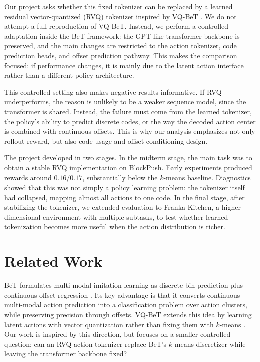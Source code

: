 \documentclass[conference]{IEEEtran}
\begin{document}
Our project asks whether this fixed tokenizer can be replaced by a learned residual vector-quantized (RVQ) tokenizer inspired by VQ-BeT \cite{lee2024vqbet}. We do not attempt a full reproduction of VQ-BeT. Instead, we perform a controlled adaptation inside the BeT framework: the GPT-like transformer backbone is preserved, and the main changes are restricted to the action tokenizer, code prediction heads, and offset prediction pathway. This makes the comparison focused: if performance changes, it is mainly due to the latent action interface rather than a different policy architecture.

This controlled setting also makes negative results informative. If RVQ underperforms, the reason is unlikely to be a weaker sequence model, since the transformer is shared. Instead, the failure must come from the learned tokenizer, the policy's ability to predict discrete codes, or the way the decoded action center is combined with continuous offsets. This is why our analysis emphasizes not only rollout reward, but also code usage and offset-conditioning design.

The project developed in two stages. In the midterm stage, the main task was to obtain a stable RVQ implementation on BlockPush. Early experiments produced rewards around $0.16/0.17$, substantially below the $k$-means baseline. Diagnostics showed that this was not simply a policy learning problem: the tokenizer itself had collapsed, mapping almost all actions to one code. In the final stage, after stabilizing the tokenizer, we extended evaluation to Franka Kitchen, a higher-dimensional environment with multiple subtasks, to test whether learned tokenization becomes more useful when the action distribution is richer.

\section{Related Work}

BeT formulates multi-modal imitation learning as discrete-bin prediction plus continuous offset regression \cite{shafiullah2022bet}. Its key advantage is that it converts continuous multi-modal action prediction into a classification problem over action clusters, while preserving precision through offsets. VQ-BeT extends this idea by learning latent actions with vector quantization rather than fixing them with $k$-means \cite{lee2024vqbet}. Our work is inspired by this direction, but focuses on a smaller controlled question: can an RVQ action tokenizer replace BeT's $k$-means discretizer while leaving the transformer backbone fixed?
\end{document}
